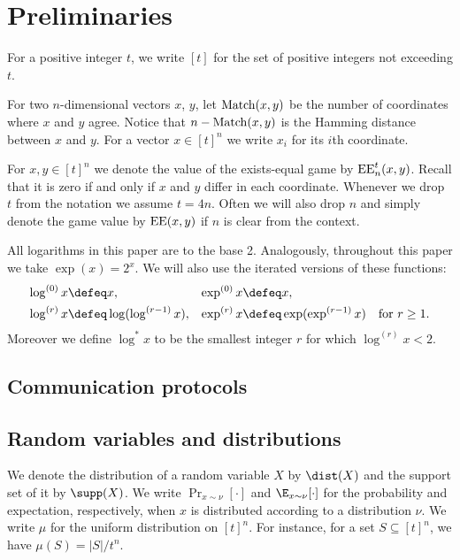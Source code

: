 \section{Preliminaries}
\label{sec:preliminaries}
For a positive integer
$t$, we write $[t]$ for the set of positive integers not
exceeding $t$.

For two $n$-dimensional vectors $x$, $y$, let
$\operatorname{Match}(x,y)$ be the number of coordinates where $x$ and $y$
agree. Notice that $n-\operatorname{Match}(x,y)$ is the Hamming distance
between $x$ and $y$. For a vector $x\in[t]^n$ we write $x_i$ for
its $i$\/th coordinate. 

For $x,y\in [t]^n$ we denote the value of the exists-equal game
by $\operatorname{EE}_n^t(x,y)$. Recall that it is zero if and only if $x$ and
$y$ differ in each coordinate. Whenever we drop $t$ from the
notation we assume $t=4n$. Often we will also drop $n$ and
simply denote the game value by $\operatorname{EE}(x,y)$ if $n$ is clear from
the context.

All logarithms in this paper are to the base 2. Analogously,
throughout this paper we take $\exp(x)=2^x$. We will also use
the iterated versions of these functions:
\begin{align*}
\log^{(0)}x&\defeq x, & \exp^{(0)}x&\defeq x,\\
\log^{(r)}x&\defeq \log(\log^{(r-1)}x), & \exp^{(r)}x&\defeq \exp(\exp^{(r-1)}x)
\quad\text{for $r\geq 1$}.
\end{align*}
Moreover we define $\log^* x$ to be the smallest integer $r$ for which
$\log^{(r)} x<2$. 

\subsection{Communication protocols}

\subsection{Random variables and distributions}
We denote the distribution of a random
variable $X$ by $\dist(X)$ and the support set of it by
$\supp(X)$. We write $\Pr_{x\sim\nu}[\cdot]$ and
$\E_{x\sim\nu}[\cdot]$ for the probability and expectation,
respectively, when $x$ is distributed according to a
distribution $\nu$. We write $\mu$ for the uniform distribution
on $[t]^n$. For instance, for a set $S\subseteq [t]^n$, we have
$\mu(S) = |S| / t^n$.

